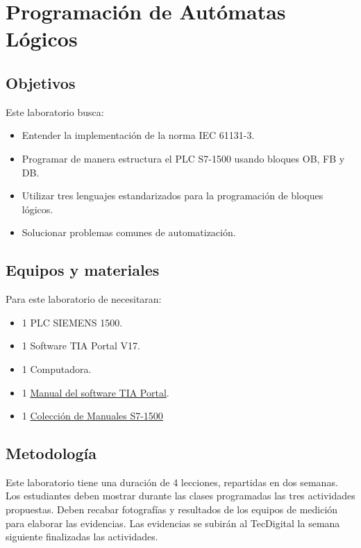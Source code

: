 \chapter{Programación de Autómatas Lógicos}


\section{Objetivos}
Este  laboratorio busca:
\begin{itemize}
    \item Entender la implementación de la norma IEC 61131-3.
    \item Programar  de manera estructura el PLC S7-1500 usando bloques OB, FB y DB.
    \item Utilizar tres lenguajes estandarizados para la programación de bloques lógicos.
    \item Solucionar problemas comunes de automatización.
\end{itemize} 

 
\section{Equipos y materiales}
Para este laboratorio de necesitaran:
\begin{itemize}
	\item 1 PLC SIEMENS 1500.
	\item 1 Software TIA Portal V17.
	\item 1 Computadora.
	\item 1 \href{https://support.industry.siemens.com/dl/files/056/109815056/att_1121729/v4/STEP_7_WinCC_V18_esES_es-ES.pdf}{Manual del software TIA Portal}.
	\item 1 \href{https://cache.industry.siemens.com/dl/files/384/86140384/att_1131259/v1/s71500_et200mp_manual_collection_es-ES.pdf}{Colección de Manuales S7-1500}
\end{itemize}

\section{Metodología}

Este laboratorio tiene una duración de 4 lecciones, repartidas en dos semanas. Los estudiantes deben mostrar durante las clases programadas las tres actividades propuestas. Deben recabar fotografías y resultados de los equipos de medición para elaborar las evidencias. Las evidencias se subirán al TecDigital la semana siguiente finalizadas las actividades.

